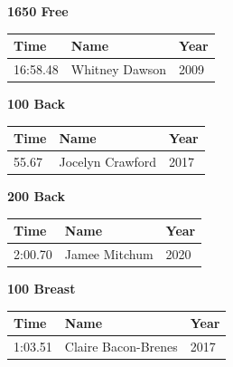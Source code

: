 \vspace{1.2em}
\noindent\begin{minipage}[t]{0.48\textwidth}
\centering
\textbf{\textcolor{teamprimary}{1650 Free}}\par
\vspace{0.5em}
\centering
\small
\renewcommand{\arraystretch}{1.0}
\setlength{\tabcolsep}{4pt}
\begin{tabular}{@{}p{1.8cm}p{3.0cm}p{1.0cm}@{}}
\toprule
\textbf{Time} & \textbf{Name} & \textbf{Year} \\
\midrule
16:58.48 & Whitney Dawson & 2009 \\
\bottomrule
\end{tabular}
\end{minipage}
\hfill
\begin{minipage}[t]{0.48\textwidth}
\centering
\textbf{\textcolor{teamprimary}{100 Back}}\par
\vspace{0.5em}
\centering
\small
\renewcommand{\arraystretch}{1.0}
\setlength{\tabcolsep}{4pt}
\begin{tabular}{@{}p{1.8cm}p{3.0cm}p{1.0cm}@{}}
\toprule
\textbf{Time} & \textbf{Name} & \textbf{Year} \\
\midrule
55.67 & Jocelyn Crawford & 2017 \\
\bottomrule
\end{tabular}
\end{minipage}
\vspace{1.2em}
\noindent\begin{minipage}[t]{0.48\textwidth}
\centering
\textbf{\textcolor{teamprimary}{200 Back}}\par
\vspace{0.5em}
\centering
\small
\renewcommand{\arraystretch}{1.0}
\setlength{\tabcolsep}{4pt}
\begin{tabular}{@{}p{1.8cm}p{3.0cm}p{1.0cm}@{}}
\toprule
\textbf{Time} & \textbf{Name} & \textbf{Year} \\
\midrule
2:00.70 & Jamee Mitchum & 2020 \\
\bottomrule
\end{tabular}
\end{minipage}
\hfill
\begin{minipage}[t]{0.48\textwidth}
\centering
\textbf{\textcolor{teamprimary}{100 Breast}}\par
\vspace{0.5em}
\centering
\small
\renewcommand{\arraystretch}{1.0}
\setlength{\tabcolsep}{4pt}
\begin{tabular}{@{}p{1.8cm}p{3.0cm}p{1.0cm}@{}}
\toprule
\textbf{Time} & \textbf{Name} & \textbf{Year} \\
\midrule
1:03.51 & Claire Bacon-Brenes & 2017 \\
\bottomrule
\end{tabular}
\end{minipage}
